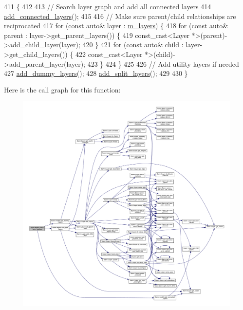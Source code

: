 \begin{DoxyCode}
411                                  \{
412 
413   \textcolor{comment}{// Search layer graph and add all connected layers}
414   \hyperlink{classlbann_1_1model_a3fb0304e6426dd28a436f50559ef2bef}{add\_connected\_layers}();
415 
416   \textcolor{comment}{// Make sure parent/child relationships are reciprocated}
417   \textcolor{keywordflow}{for} (\textcolor{keyword}{const} \textcolor{keyword}{auto}& layer : \hyperlink{classlbann_1_1model_a0229fc226ec163d1411548446104569d}{m\_layers}) \{
418     \textcolor{keywordflow}{for} (\textcolor{keyword}{const} \textcolor{keyword}{auto}& parent : layer->get\_parent\_layers()) \{
419       \textcolor{keyword}{const\_cast<}Layer *\textcolor{keyword}{>}(parent)->add\_child\_layer(layer);
420     \}
421     \textcolor{keywordflow}{for} (\textcolor{keyword}{const} \textcolor{keyword}{auto}& child : layer->get\_child\_layers()) \{
422       \textcolor{keyword}{const\_cast<}Layer *\textcolor{keyword}{>}(child)->add\_parent\_layer(layer);
423     \}
424   \}
425 
426   \textcolor{comment}{// Add utility layers if needed}
427   \hyperlink{classlbann_1_1model_a6ba9a836e5ba52c999c5234cfa5e62c2}{add\_dummy\_layers}();
428   \hyperlink{classlbann_1_1model_ac56d43e457cd4dfc3b88122bd10d286e}{add\_split\_layers}();
429 
430 \}
\end{DoxyCode}
Here is the call graph for this function\+:\nopagebreak
\begin{figure}[H]
\begin{center}
\leavevmode
\includegraphics[width=350pt]{classlbann_1_1model_a7b3e2a643c658dcaa7478d2568f29784_cgraph}
\end{center}
\end{figure}
